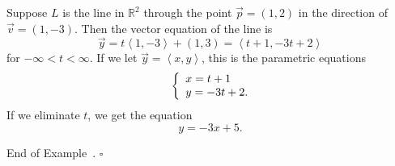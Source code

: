 \documentclass[10pt]{article}
\theoremstyle{definition}
\newtheorem{example}[theorem]{Example}
\renewenvironment{example}
{\begin{oldexample}}
  {\par\smallskip\hfill   End of Example~\theexample. $\square$    \par\end{oldexample}}
\newcommand{\1}[1]{\textbf{1}_{\left[#1\right]}} %
\def\R{\mathbb{R}} %
\begin{document}
\begin{example}
  Suppose $L$ is the line in $\R^{2}$ through the point $\vec{p}=(1,2)$ in the
  direction of $\vec{v}=(1,-3)$. Then the vector equation of the line is
  \begin{equation*}
    \vec{y} 
    = t \left\langle 1,-3 \right\rangle +(1,3) 
    = \left\langle t+1,-3t+2 \right\rangle 
  \end{equation*}
  for $-\infty<t<\infty$. If we let $\vec{y}=\left\langle x,y \right\rangle$,
  this is the parametric equations
  \begin{equation*}
    \left\{ \begin{array}{l@{}l}
        x=t+1 \\
        y=-3t+2. \\
      \end{array}\right.
  \end{equation*}
  If we eliminate $t$, we get the equation
  \begin{equation*}
    y=-3x+5.
  \end{equation*}
\end{example}
\end{document}
